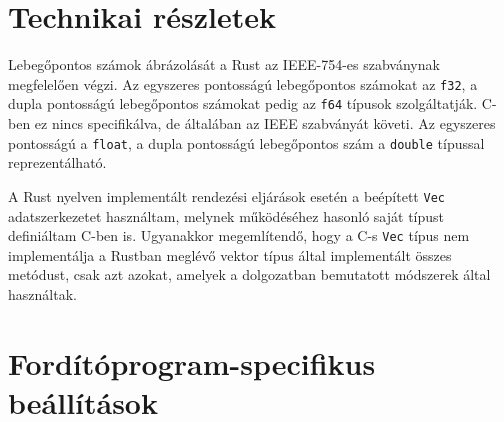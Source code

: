 \section{Technikai részletek}
Lebegőpontos számok ábrázolását a Rust az IEEE-754-es szabványnak megfelelően végzi. Az egyszeres pontosságú lebegőpontos számokat az \lstinline{f32}, a dupla pontosságú lebegőpontos számokat pedig az \lstinline{f64} típusok szolgáltatják. C-ben ez nincs specifikálva, de általában az IEEE szabványát követi. Az egyszeres pontosságú a \lstinline{float}, a dupla pontosságú lebegőpontos szám a \lstinline{double} típussal reprezentálható.

A Rust nyelven implementált rendezési eljárások esetén a beépített \lstinline{Vec} adatszerkezetet használtam, melynek működéséhez hasonló saját típust definiáltam C-ben is. Ugyanakkor megemlítendő, hogy a C-s \lstinline{Vec} típus nem implementálja a Rustban meglévő vektor típus által implementált összes metódust, csak azt azokat, amelyek a dolgozatban bemutatott módszerek által használtak.

\section{Fordítóprogram-specifikus beállítások}
